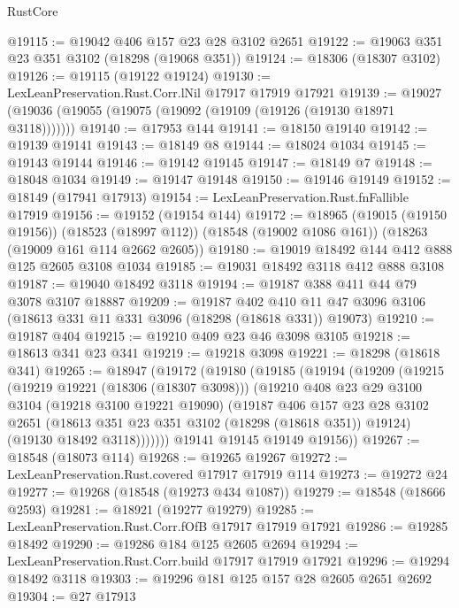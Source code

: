 \begin{lexlean}{RustCore}
\begin{coremodule}
@19115 := @19042 @406 @157 @23 @28 @3102 @2651
@19122 := @19063 @351 @23 @351 @3102 (@18298 (@19068 @351))
@19124 := @18306 (@18307 @3102)
@19126 := @19115 (@19122 @19124)
@19130 := LexLeanPreservation.Rust.Corr.lNil @17917 @17919 @17921
@19139 := @19027 (@19036 (@19055 (@19075 (@19092 (@19109 (@19126 (@19130 @18971 @3118)))))))
@19140 := @17953 @144
@19141 := @18150 @19140
@19142 := @19139 @19141
@19143 := @18149 @8
@19144 := @18024 @1034
@19145 := @19143 @19144
@19146 := @19142 @19145
@19147 := @18149 @7
@19148 := @18048 @1034
@19149 := @19147 @19148
@19150 := @19146 @19149
@19152 := @18149 (@17941 @17913)
@19154 := LexLeanPreservation.Rust.fnFallible @17919
@19156 := @19152 (@19154 @144)
@19172 := @18965
    (@19015 (@19150 @19156))
    (@18523 (@18997 @112))
    (@18548 (@19002 @1086 @161))
    (@18263 (@19009 @161 @114 @2662 @2605))
@19180 := @19019 @18492 @144 @412 @888 @125 @2605 @3108 @1034
@19185 := @19031 @18492 @3118 @412 @888 @3108
@19187 := @19040 @18492 @3118
@19194 := @19187 @388 @411 @44 @79 @3078 @3107 @18887
@19209 := @19187
    @402
    @410
    @11
    @47
    @3096
    @3106
    (@18613 @331 @11 @331 @3096 (@18298 (@18618 @331)) @19073)
@19210 := @19187 @404
@19215 := @19210 @409 @23 @46 @3098 @3105
@19218 := @18613 @341 @23 @341
@19219 := @19218 @3098
@19221 := @18298 (@18618 @341)
@19265 := @18947
    (@19172
      (@19180
        (@19185
          (@19194
            (@19209
              (@19215
                (@19219 @19221 (@18306 (@18307 @3098)))
                (@19210
                  @408
                  @23
                  @29
                  @3100
                  @3104
                  (@19218 @3100 @19221 @19090)
                  (@19187
                    @406
                    @157
                    @23
                    @28
                    @3102
                    @2651
                    (@18613 @351 @23 @351 @3102 (@18298 (@18618 @351)) @19124)
                    (@19130 @18492 @3118)))))))
        @19141
        @19145
        @19149
        @19156))
@19267 := @18548 (@18073 @114)
@19268 := @19265 @19267
@19272 := LexLeanPreservation.Rust.covered @17917 @17919 @114
@19273 := @19272 @24
@19277 := @19268 (@18548 (@19273 @434 @1087))
@19279 := @18548 (@18666 @2593)
@19281 := @18921 (@19277 @19279)
@19285 := LexLeanPreservation.Rust.Corr.fOfB @17917 @17919 @17921
@19286 := @19285 @18492
@19290 := @19286 @184 @125 @2605 @2694
@19294 := LexLeanPreservation.Rust.Corr.build @17917 @17919 @17921
@19296 := @19294 @18492 @3118
@19303 := @19296 @181 @125 @157 @28 @2605 @2651 @2692
@19304 := @27 @17913

\end{coremodule}
\end{lexlean}
